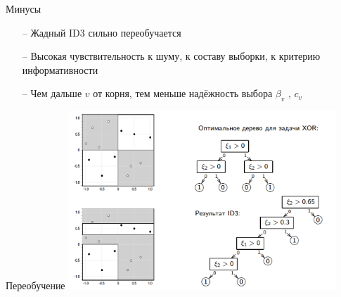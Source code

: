 \documentclass[10pt]{beamer}
\begin{document}
\begin{frame}{Минусы}
	\begin{enumerate} [<+- |alert@+>] 
	\item[--] Жадный ID3 сильно переобучается
	\item[--] Высокая чувствительность к шуму, к составу выборки, к критерию информативности
	\item[--] Чем дальше $v$ от корня, тем меньше надёжность выбора $\beta_v$ , $c_v$
	\end{enumerate}
\end{frame}

\begin{frame}{Переобучение}
  \includegraphics[height=190pt, keepaspectratio = true]{images/overfitting}   
\end{frame}
\end{document}
